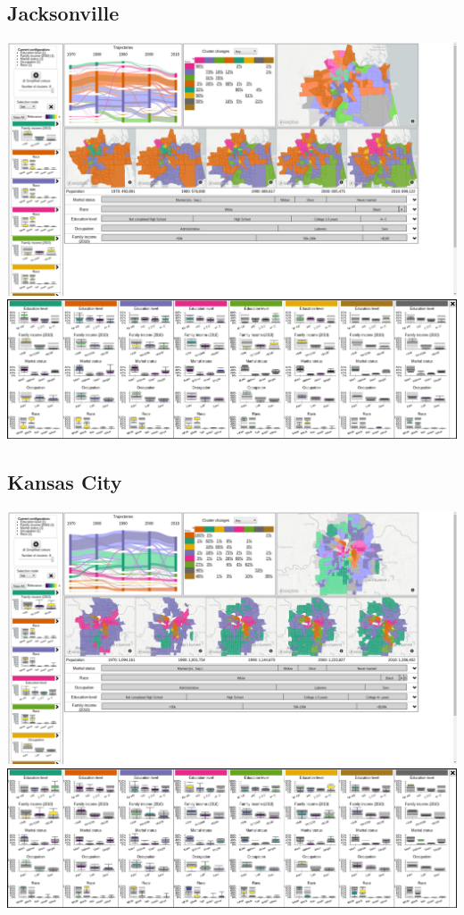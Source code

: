 \documentclass[a4paper]{article}
\begin{document}
\subsection{Jacksonville}
\begin{center}
	\includegraphics[width=\linewidth]{27a.png}
	\includegraphics[width=\linewidth]{27b.png}
\end{center} \clearpage



\subsection{Kansas City}
\begin{center}
	\includegraphics[width=\linewidth]{28a.png}
	\includegraphics[width=\linewidth]{28b.png}
\end{center} \clearpage
\end{document}
